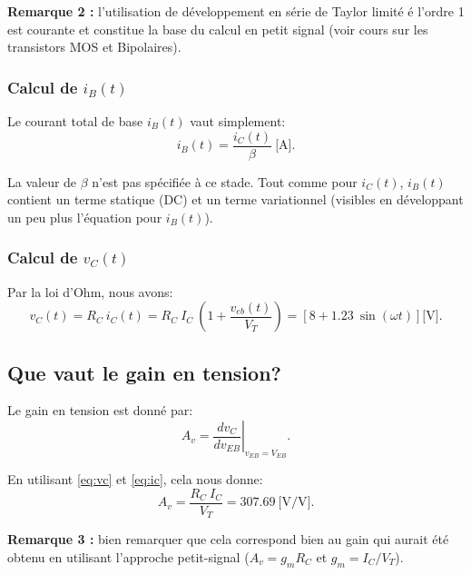 \documentclass[frenchb,DIV=13]{scrartcl}
\begin{document}
\textbf{Remarque 2 :} l'utilisation de développement en série de Taylor limité é l'ordre 1 est courante et
constitue la base du calcul en petit signal (voir cours sur les transistors MOS et Bipolaires).

\subsubsection*{Calcul de $i_B(t)$}
Le courant total de base $i_B(t)$ vaut simplement:
\begin{equation}
	i_B(t) = \dfrac{i_C(t)}{\beta} ~\mbox{[A]}.
\end{equation}

La valeur de $\beta$ n'est pas spécifiée à ce stade. Tout comme pour $i_C(t)$, $i_B(t)$ contient un
terme statique (DC) et un terme variationnel (visibles en développant un peu plus l'équation pour
$i_B(t)$).

\subsubsection*{Calcul de $v_C(t)$}
Par la loi d'Ohm, nous avons:
\begin{equation}
	v_C(t) = R_C~i_C(t) = R_C~I_C ~ \left(1 + \dfrac{v_{eb}(t)}{V_T}\right) = \left[8 + 1.23~\sin\left(\omega t\right)\right] \mbox{[V]}.\label{eq:vc}
\end{equation}

\subsection*{Que vaut le gain en tension?}

Le gain en tension est donné par:
\begin{equation}
	A_v = \left.\dfrac{dv_{C}}{dv_{EB}}\right|_{v_{EB} = V_{EB}}.
\end{equation}

En utilisant \eqref{eq:vc} et \eqref{eq:ic}, cela nous donne:
\begin{equation}
	A_v = \dfrac{R_C~I_C}{V_T} = 307.69~\mbox{[V/V]}.
\end{equation}

\textbf{Remarque 3 :} bien remarquer que cela correspond bien au gain qui aurait été obtenu en
utilisant l'approche petit-signal ($A_v = g_mR_C$ et $g_m = I_C/V_T$).
\end{document}
